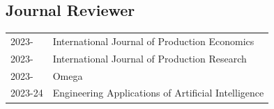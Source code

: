 






\subsection*{Journal Reviewer}
% 
\begin{longtable}[l]{@{}p{} p{}}

    2023- & International Journal of Production Economics \\
    2023- & International Journal of Production Research \\
    2023- & Omega  \\
    2023-24 & Engineering Applications of Artificial Intelligence \\
    
\end{longtable}


